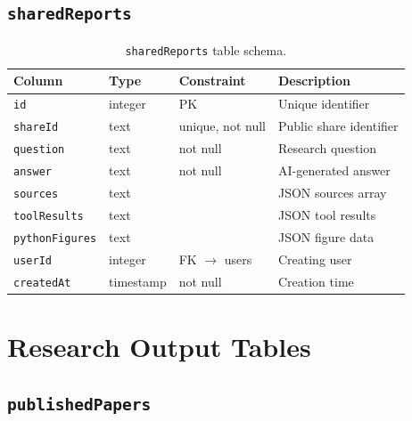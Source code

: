 \subsection{\texttt{sharedReports}}

\begin{longtable}{lllp{4cm}}
\caption{\texttt{sharedReports} table schema.} \label{tab:schema-shared} \\
\toprule
\textbf{Column} & \textbf{Type} & \textbf{Constraint} & \textbf{Description} \\
\midrule
\endfirsthead
\texttt{id} & integer & PK & Unique identifier \\
\texttt{shareId} & text & unique, not null & Public share identifier \\
\texttt{question} & text & not null & Research question \\
\texttt{answer} & text & not null & AI-generated answer \\
\texttt{sources} & text & & JSON sources array \\
\texttt{toolResults} & text & & JSON tool results \\
\texttt{pythonFigures} & text & & JSON figure data \\
\texttt{userId} & integer & FK $\to$ users & Creating user \\
\texttt{createdAt} & timestamp & not null & Creation time \\
\bottomrule
\end{longtable}

\section{Research Output Tables}
\label{sec:schema:output}

\subsection{\texttt{publishedPapers}}

